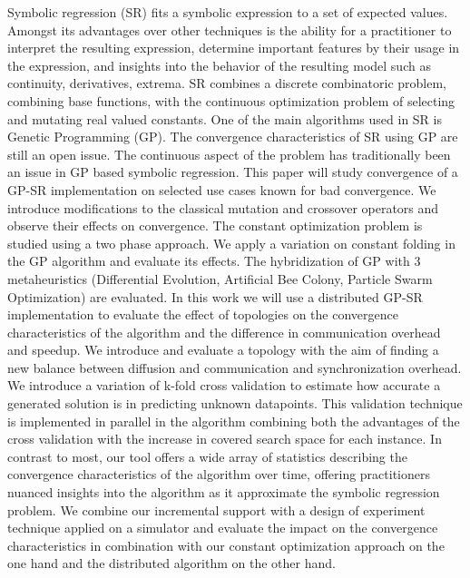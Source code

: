 Symbolic regression (SR) fits a symbolic expression to a set of expected values.
Amongst its advantages over other techniques is the ability for a practitioner to interpret the resulting expression, determine important features by their usage in the expression, and insights into the behavior of the resulting model such as continuity, derivatives, extrema.
SR combines a discrete combinatoric problem, combining base functions, with the continuous optimization problem of selecting and mutating real valued constants.
One of the main algorithms used in SR is Genetic Programming (GP). The convergence characteristics of SR using GP are still an open issue.
The continuous aspect of the problem has traditionally been an issue in GP based symbolic regression. This paper will study convergence of a GP-SR implementation on selected use cases known for bad convergence.
We introduce modifications to the classical mutation and crossover operators and observe their effects on convergence. 
The constant optimization problem is studied using a two phase approach. We apply a variation on constant folding in the GP algorithm and evaluate its effects. The hybridization of GP with 3 metaheuristics (Differential Evolution, Artificial Bee Colony, Particle Swarm Optimization) are evaluated. 
In this work we will use a distributed GP-SR implementation to evaluate the effect of topologies on the convergence characteristics of the algorithm and the difference in communication overhead and speedup.
We introduce and evaluate a topology with the aim of finding a new balance between diffusion and communication and synchronization overhead.
We introduce a variation of k-fold cross validation to estimate how accurate a generated solution is in predicting unknown datapoints. This validation technique is implemented in parallel in the algorithm combining both the advantages of the cross validation with the increase in covered search space for each instance.
In contrast to most, our tool offers a wide array of statistics describing the convergence characteristics of the algorithm over time, offering practitioners nuanced insights into the algorithm as it approximate the symbolic regression problem.
We combine our incremental support with a design of experiment technique applied on a simulator and evaluate the impact on the convergence characteristics in combination with our constant optimization approach on the one hand and the distributed algorithm on the other hand.